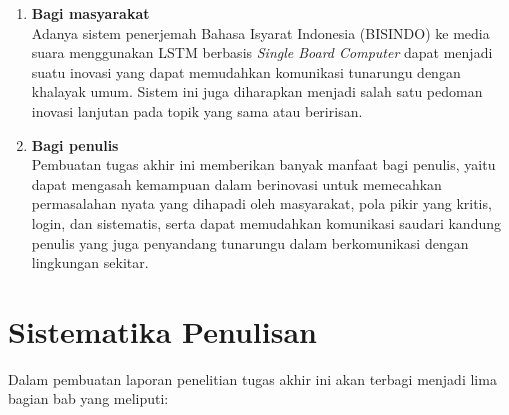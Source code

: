 \begin{enumerate}[nolistsep]

  \item \textbf{Bagi masyarakat} \\     
  Adanya sistem penerjemah Bahasa Isyarat Indonesia (BISINDO) ke media suara menggunakan LSTM berbasis \emph{Single Board Computer} dapat menjadi suatu inovasi yang dapat memudahkan komunikasi tunarungu dengan khalayak umum. Sistem ini juga diharapkan menjadi salah satu pedoman inovasi lanjutan pada topik yang sama atau beririsan.
        \vspace{2ex}

  \item \textbf{Bagi penulis} \\
  Pembuatan tugas akhir ini memberikan banyak manfaat bagi penulis, yaitu dapat mengasah kemampuan dalam berinovasi untuk memecahkan permasalahan nyata yang dihapadi oleh masyarakat, pola pikir yang kritis, login, dan sistematis, serta dapat memudahkan komunikasi saudari kandung penulis yang juga penyandang tunarungu dalam berkomunikasi dengan lingkungan sekitar.

\end{enumerate}

\section{Sistematika Penulisan}
\label{sec:sistematikapenulisan
}

Dalam pembuatan laporan penelitian tugas akhir ini akan terbagi menjadi lima bagian bab yang meliputi:

